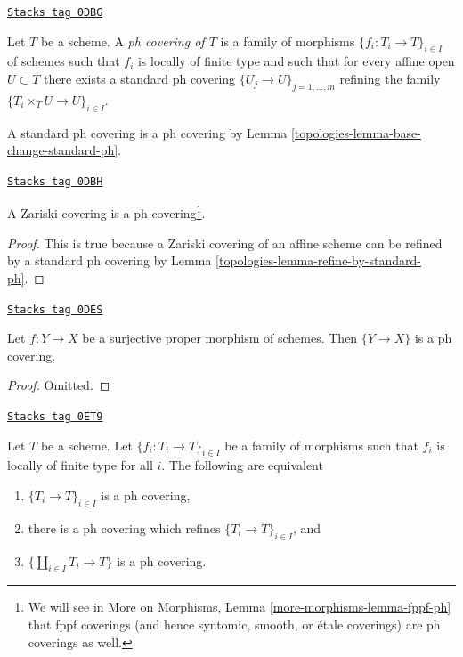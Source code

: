 \begin{definition}[Ph covering]
\label{topologies-definition-ph-covering}
\href{https://stacks.math.columbia.edu/tag/0DBG}{\texttt{Stacks tag 0DBG}}

Let $T$ be a scheme. A {\it ph covering of $T$} is a family
of morphisms $\{f_i : T_i \to T\}_{i \in I}$ of schemes such
that $f_i$ is locally of finite type and such that for every
affine open $U \subset T$ there exists a standard ph covering
$\{U_j \to U\}_{j = 1, \ldots, m}$ refining the family
$\{T_i \times_T U \to U\}_{i \in I}$.
\end{definition}

A standard ph covering is a ph covering by
Lemma \ref{topologies-lemma-base-change-standard-ph}.

\begin{lemma}[Zariski ph]
\label{topologies-lemma-zariski-ph}
\href{https://stacks.math.columbia.edu/tag/0DBH}{\texttt{Stacks tag 0DBH}}

A Zariski covering is a ph covering\footnote{We will see
in More on Morphisms, Lemma \ref{more-morphisms-lemma-fppf-ph} that
fppf coverings (and hence syntomic, smooth, or \'etale coverings)
are ph coverings as well.}.
\end{lemma}

\begin{proof}

This is true because a Zariski covering of an affine scheme
can be refined by a standard ph covering by
Lemma \ref{topologies-lemma-refine-by-standard-ph}.
\end{proof}

\begin{lemma}
\label{topologies-lemma-surjective-proper-ph}
\href{https://stacks.math.columbia.edu/tag/0DES}{\texttt{Stacks tag 0DES}}

Let $f : Y \to X$ be a surjective proper morphism of schemes.
Then $\{Y \to X\}$ is a ph covering.
\end{lemma}

\begin{proof}
Omitted.
\end{proof}

\begin{lemma}[Refine by ph]
\label{topologies-lemma-refine-by-ph}
\href{https://stacks.math.columbia.edu/tag/0ET9}{\texttt{Stacks tag 0ET9}}

Let $T$ be a scheme. Let $\{f_i : T_i \to T\}_{i \in I}$ be a family
of morphisms such that $f_i$ is locally of finite type for all $i$.
The following are equivalent
\begin{enumerate}
\item $\{T_i \to T\}_{i \in I}$ is a ph covering,
\item there is a ph covering which refines $\{T_i \to T\}_{i \in I}$, and
\item $\{\coprod_{i \in I} T_i \to T\}$ is a ph covering.
\end{enumerate}
\end{lemma}

